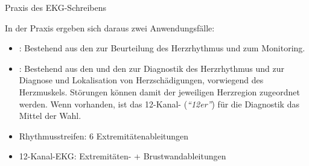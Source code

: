 \TextSlide
{Praxis des EKG-Schreibens}%
{%
In der Praxis ergeben sich daraus zwei Anwendungsfälle:

\begin{itemize}
    \item {}: 
    Bestehend aus den  
    zur Beurteilung des Herzrhythmus und zum Monitoring.
    \item {}: 
    Bestehend aus den  und den 
    zur Diagnostik des Herzrhythmus 
    und zur Diagnose und Lokalisation von Herzschädigungen, 
    vorwiegend des Herzmuskels. 
    Störungen können damit der jeweiligen Herzregion zugeordnet werden. 
    Wenn vorhanden,
    ist das 12-Kanal- (\emph{\enquote{12er}}) für die
    Diagnostik das Mittel der Wahl. 
\end{itemize}
}%
{%
\begin{itemize}
  \item Rhythmusstreifen: 6 Extremitätenableitungen
  \item 12-Kanal-EKG: Extremitäten- + Brustwandableitungen
\end{itemize}
}%


